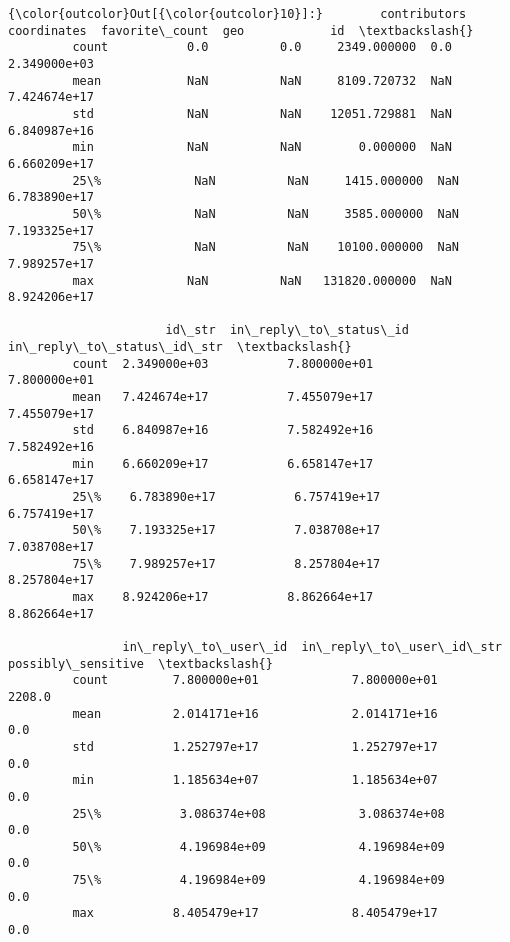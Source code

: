 \documentclass[11pt]{article}
\begin{document}
\begin{Verbatim}[commandchars=\\\{\}]
{\color{outcolor}Out[{\color{outcolor}10}]:}        contributors  coordinates  favorite\_count  geo            id  \textbackslash{}
         count           0.0          0.0     2349.000000  0.0  2.349000e+03   
         mean            NaN          NaN     8109.720732  NaN  7.424674e+17   
         std             NaN          NaN    12051.729881  NaN  6.840987e+16   
         min             NaN          NaN        0.000000  NaN  6.660209e+17   
         25\%             NaN          NaN     1415.000000  NaN  6.783890e+17   
         50\%             NaN          NaN     3585.000000  NaN  7.193325e+17   
         75\%             NaN          NaN    10100.000000  NaN  7.989257e+17   
         max             NaN          NaN   131820.000000  NaN  8.924206e+17   
         
                      id\_str  in\_reply\_to\_status\_id  in\_reply\_to\_status\_id\_str  \textbackslash{}
         count  2.349000e+03           7.800000e+01               7.800000e+01   
         mean   7.424674e+17           7.455079e+17               7.455079e+17   
         std    6.840987e+16           7.582492e+16               7.582492e+16   
         min    6.660209e+17           6.658147e+17               6.658147e+17   
         25\%    6.783890e+17           6.757419e+17               6.757419e+17   
         50\%    7.193325e+17           7.038708e+17               7.038708e+17   
         75\%    7.989257e+17           8.257804e+17               8.257804e+17   
         max    8.924206e+17           8.862664e+17               8.862664e+17   
         
                in\_reply\_to\_user\_id  in\_reply\_to\_user\_id\_str  possibly\_sensitive  \textbackslash{}
         count         7.800000e+01             7.800000e+01              2208.0   
         mean          2.014171e+16             2.014171e+16                 0.0   
         std           1.252797e+17             1.252797e+17                 0.0   
         min           1.185634e+07             1.185634e+07                 0.0   
         25\%           3.086374e+08             3.086374e+08                 0.0   
         50\%           4.196984e+09             4.196984e+09                 0.0   
         75\%           4.196984e+09             4.196984e+09                 0.0   
         max           8.405479e+17             8.405479e+17                 0.0   
         

\end{Verbatim}
\end{document}
